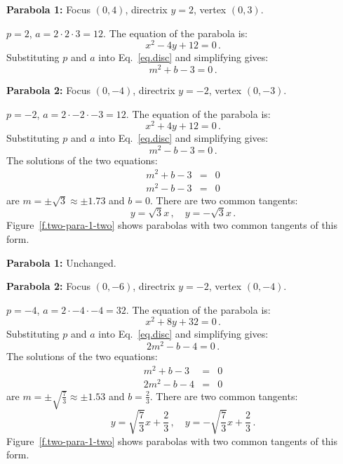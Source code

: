 \newpage

\begin{example}\mbox{}

\noindent\textbf{Parabola 1:} Focus $(0,4)$, directrix $y=2$, vertex $(0,3)$.

\noindent{}$p=2$, $a=2\cdot 2\cdot 3=12$. The equation of the parabola is:
\[
x^2-4y +12=0\,.
\]
Substituting $p$ and $a$ into Eq.~\ref{eq.disc} and simplifying gives:
\[
m^2+b-3=0\,.
\]

\noindent\textbf{Parabola 2:} Focus $(0,-4)$, directrix $y=-2$, vertex $(0,-3)$.

\noindent{}$p=-2$, $a=2\cdot -2\cdot -3=12$. The equation of the parabola is:
\[
x^2+4y+12=0\,.
\]
Substituting $p$ and $a$ into Eq.~\ref{eq.disc} and simplifying gives:
\[
m^2-b-3=0\,.
\]
The solutions of the two equations:
\begin{eqnarray*}
m^2+b-3&=&0\\
m^2-b-3&=&0
\end{eqnarray*}
are $m=\pm\sqrt{3}\approx \pm 1.73$ and $b=0$. There are two common tangents:
\[
y=\sqrt{3}x\,,\quad y=-\sqrt{3}x\,.
\]
Figure~\ref{f.two-para-1-two} shows parabolas with two common tangents of this form.
\end{example}

\begin{example}\mbox{}

\noindent\textbf{Parabola 1:}
Unchanged.

\noindent\textbf{Parabola 2:} Focus $(0,-6)$, directrix $y=-2$, vertex $(0,-4)$.

\noindent{}$p=-4$, $a=2\cdot -4\cdot -4=32$. The equation of the parabola is:
\[
x^2+8y +32=0\,.
\]
Substituting $p$ and $a$ into Eq.~\ref{eq.disc} and simplifying gives:
\[
2m^2-b-4=0\,.
\]
The solutions of the two equations:
\begin{eqnarray*}
m^2+b-3&=&0\\
2m^2-b-4&=&0
\end{eqnarray*}
are $m=\pm\sqrt{\displaystyle\frac{7}{3}}\approx \pm 1.53$ and $b=\displaystyle\frac{2}{3}$. There are two common tangents:
\[
y=\sqrt{\frac{7}{3}}x+\frac{2}{3}\,,\quad y=-\sqrt{\frac{7}{3}}x+\frac{2}{3}\,.
\]
Figure~\ref{f.two-para-1-two} shows parabolas with two common tangents of this form.
\end{example}


